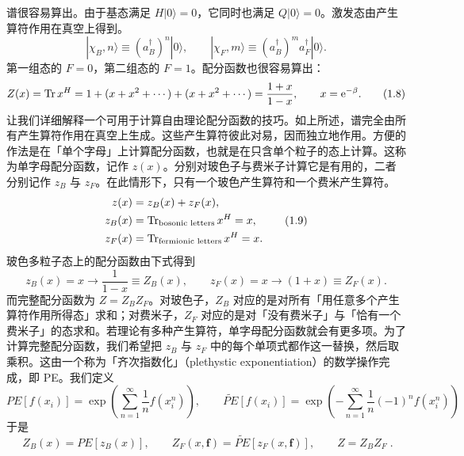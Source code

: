 谱很容易算出。由于基态满足 $H|0\rangle = 0$，它同时也满足 $Q|0\rangle = 0$。激发态由产生算符作用在真空上得到。
\[
|\chi_B, n\rangle \equiv (a_B^\dagger)^n |0\rangle ,\qquad
|\chi_F, m\rangle \equiv (a_B^\dagger)^m a_F^\dagger |0\rangle .
\tag{1.7}
\]
第一组态的 $F = 0$，第二组态的 $F = 1$。配分函数也很容易算出：
\[
Z(x) = \operatorname{Tr} x^H = 1 + (x + x^2 + \cdots) + (x + x^2 + \cdots) = \frac{1+x}{1-x} ,\qquad x = \mathrm{e}^{-\beta} .
\tag{1.8}
\]
让我们详细解释一个可用于计算自由理论配分函数的技巧。如上所述，谱完全由所有产生算符作用在真空上生成。这些产生算符彼此对易，因而独立地作用。方便的作法是在「单个字母」上计算配分函数，也就是在只含单个粒子的态上计算。这称为单字母配分函数，记作 $z(x)$。分别对玻色子与费米子计算它是有用的，二者分别记作 $z_B$ 与 $z_F$。在此情形下，只有一个玻色产生算符和一个费米产生算符。
\[
\begin{aligned}
z(x) &= z_B(x) + z_F(x),\\
z_B(x) &= \operatorname{Tr}_{\text{bosonic letters}} x^H = x,\\
z_F(x) &= \operatorname{Tr}_{\text{fermionic letters}} x^H = x .
\end{aligned}
\tag{1.9}
\]
玻色多粒子态上的配分函数由下式得到
\[
z_B(x) = x \to \frac{1}{1-x} \equiv Z_B(x) ,\qquad
z_F(x) = x \to (1+x) \equiv Z_F(x) .
\tag{1.10}
\]
而完整配分函数为 $Z = Z_B Z_F$。对玻色子，$Z_B$ 对应的是对所有「用任意多个产生算符作用所得态」求和；对费米子，$Z_F$ 对应的是对「没有费米子」与「恰有一个费米子」的态求和。若理论有多种产生算符，单字母配分函数就会有更多项。为了计算完整配分函数，我们希望把 $z_B$ 与 $z_F$ 中的每个单项式都作这一替换，然后取乘积。这由一个称为「齐次指数化」（plethystic exponentiation）的数学操作完成，即 PE。我们定义
\[
PE[f(x_i)] = \exp\left(\sum_{n=1}^{\infty}\frac{1}{n} f(x_i^n)\right),\qquad
\widetilde{PE}[f(x_i)] = \exp\left(-\sum_{n=1}^{\infty}\frac{1}{n}(-1)^n f(x_i^n)\right)
\tag{1.11}
\]
于是
\[
\boxed{\;Z_B(x) = PE[z_B(x)],\qquad
Z_F(x,\mathbf{f}) = \widetilde{PE}[z_F(x,\mathbf{f})],\qquad
Z = Z_B Z_F\;.}
\tag{1.12}
\]

